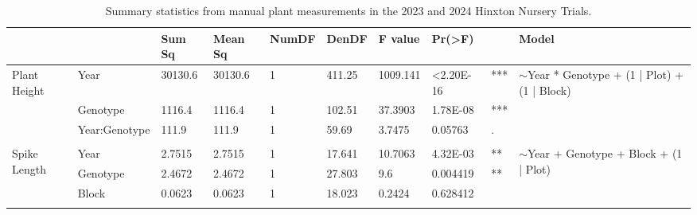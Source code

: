 \documentclass{article}
\begin{document}
\begin{table}[ht]
	\centering
	\caption{Summary statistics from manual plant measurements in the 2023
		and 2024 Hinxton Nursery Trials.}
	\begin{adjustbox}
		{width=\textwidth}
		\begin{tabular}{@{}llllllllll@{}}
			\toprule                               & \textbf{}     & Sum Sq   & Mean Sq     & NumDF     & DenDF    & F value  & Pr(\textgreater{}F) &     & Model                                                             \\
			\midrule \multirow{3}{*}{Plant Height} & Year          & 30130.6  & 30130.6     & 1         & 411.25   & 1009.141 & \textless{}2.20E-16 & *** & \multirow{3}{*}{$\sim$Year * Genotype + (1 | Plot) + (1 | Block)} \\
			                                       & Genotype      & 1116.4   & 1116.4      & 1         & 102.51   & 37.3903  & 1.78E-08            & *** &                                                                   \\
			                                       & Year:Genotype & 111.9    & 111.9       & 1         & 59.69    & 3.7475   & 0.05763             & .   &                                                                   \\
			                                       &               &          &             &           &          &          &                     &     &                                                                   \\
			\multirow{3}{*}{Spike Length}          & Year          & 2.7515   & 2.7515      & 1         & 17.641   & 10.7063  & 4.32E-03            & **  & \multirow{3}{*}{$\sim$Year + Genotype + Block + (1 | Plot)}       \\
			                                       & Genotype      & 2.4672   & 2.4672      & 1         & 27.803   & 9.6      & 0.004419            & **  &                                                                   \\
			                                       & Block         & 0.0623   & 0.0623      & 1         & 18.023   & 0.2424   & 0.628412            &     &                                                                   \\
			                                       &               &          &             &           &          &          &                     &     &                                                                   \\

\end{tabular}
\end{adjustbox}
\end{table}
\end{document}
